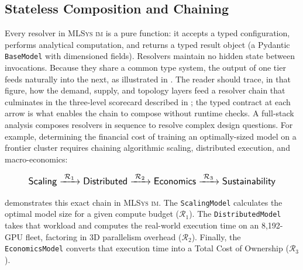 \documentclass[10pt,twocolumn]{article}
\newcommand{\mlsysim}{\mbox{\textsc{MLSys}\,\textperiodcentered\,\textsc{im}}\xspace}
\begin{document}
\subsection{Stateless Composition and Chaining}
\label{sec:solvers-compose}

Every resolver in \mlsysim is a pure function: it accepts a typed configuration, performs analytical computation, and returns a typed result object (a Pydantic \texttt{BaseModel} with dimensioned fields). Resolvers maintain no hidden state between invocations. Because they share a common type system, the output of one tier feeds naturally into the next, as illustrated in . The reader should trace, in that figure, how the demand, supply, and topology layers feed a resolver chain that culminates in the three-level scorecard described in ; the typed contract at each arrow is what enables the chain to compose without runtime checks. A full-stack analysis composes resolvers in sequence to resolve complex design questions. For example, determining the financial cost of training an optimally-sized model on a frontier cluster requires chaining algorithmic scaling, distributed execution, and macro-economics:

\begin{equation}
\label{eq:chain}
\resizebox{0.88\columnwidth}{!}{$\displaystyle
\mathsf{Scaling} \xrightarrow{\;\mathcal{R}_1\;} \mathsf{Distributed} \xrightarrow{\;\mathcal{R}_2\;} \mathsf{Economics} \xrightarrow{\;\mathcal{R}_3\;} \mathsf{Sustainability}
$}
\end{equation}

 demonstrates this exact chain in \mlsysim. The \texttt{ScalingModel} calculates the optimal model size for a given compute budget ($\mathcal{R}_1$). The \texttt{DistributedModel} takes that workload and computes the real-world execution time on an 8,192-GPU fleet, factoring in 3D parallelism overhead ($\mathcal{R}_2$). Finally, the \texttt{EconomicsModel} converts that execution time into a Total Cost of Ownership ($\mathcal{R}_3$).
\end{document}
